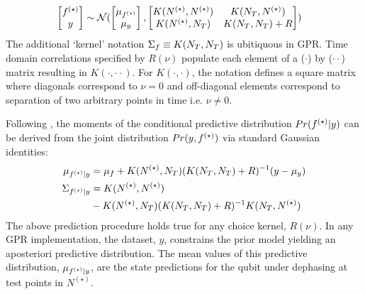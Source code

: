 \begin{align}
\begin{bmatrix} f^{(\star)} \\y \end{bmatrix} & \sim \mathcal{N} (\begin{bmatrix} \mu_{f^{(\star)}} \\ \mu_y
\end{bmatrix} , \begin{bmatrix}   K(N^{(\star)},N^{(\star)})&K(N_T,N^{(\star)}) \\ K(N^{(\star)},N_T) & K(N_T,N_T) + R \end{bmatrix} )
\end{align}
The additional `kernel' notation $\Sigma_f  \equiv K(N_T, N_T)$ is ubitiquous in GPR. Time domain correlations specified by $R(\nu)$ populate each element of a ($\cdot$) by ($\cdot \cdot$) matrix resulting in $K(\cdot, \cdot \cdot)$. For $K(\cdot{},\cdot)$, the notation defines a square matrix where diagonals correspond to $\nu=0$ and off-diagonal elements correspond to separation of two arbitrary points in time i.e. $\nu \neq 0 $. 
 
Following \cite{rasmussen2005gaussian}, the moments of the conditional predictive distribution $Pr(f^{(\star)}|y)$ can be derived from the joint distribution $Pr(y,f^{(\star)})$ via standard Gaussian identities:
\begin{align}
\mu_{f^{(\star)}|y} &= \mu_f + K(N^{(\star)},N_T)(K(N_T,N_T) + R )^{-1} (y - \mu_y) \\
\Sigma_{f^{(\star)}|y} &= K(N^{(\star)},N^{(\star)}) \nonumber \\
& - K(N^{(\star)},N_T)(K(N_T, N_T) + R)^{-1}K(N_T,N^{(\star)}) 
\end{align}
The above prediction procedure holds true for any choice kernel, $R(\nu)$. In any GPR implementation, the dataset, $y$, constrains the prior model yielding an aposteriori predictive distribution. The mean values of this predictive distribution, $\mu_{f^{(\star)}|y}$, are the state predictions for the qubit under dephasing at test points in $N^{(\star)}$.


